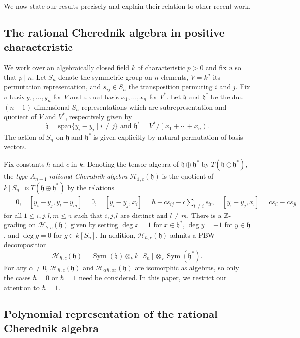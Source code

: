 \documentclass{amsart}
\numberwithin{equation}{section}
\theoremstyle{definition}
\newcommand{\ZZ}{\mathbb{Z}}
\newcommand{\h}{\mathfrak{h}}
\newcommand{\HH}{\mathcal{H}}
\newcommand{\Sym}{\operatorname{Sym}}
\newcommand{\sspan}{\text{span}}
\begin{document}
We now state our results precisely and explain their relation to other recent work.

\subsection{The rational Cherednik algebra in positive characteristic}

We work over an algebraically closed field $k$ of characteristic $p > 0$ and fix $n$ so that $p \mid n$.  Let $S_n$ denote the symmetric group on $n$ elements, $V = k^n$ its permutation representation, and $s_{ij} \in S_n$ the transposition permuting $i$ and $j$.  Fix a basis $y_1,\ldots,y_{n}$ for $V$ and a dual basis $x_1, \ldots, x_{n}$ for $V^*$.  Let $\h$ and $\h^*$ be the dual $(n - 1)$-dimensional $S_n$-representations which are subrepresentation and quotient of $V$ and $V^*$, respectively given by
\[
\h = \sspan\{y_i - y_j \mid i \neq j\} \text{ and } \h^* = V^*/(x_1 + \cdots + x_{n}).
\]
The action of $S_n$ on $\h$ and $\h^*$ is given explicitly by natural permutation of basis vectors.

Fix constants $\hbar$ and $c$ in $k$.  Denoting the tensor algebra of $\h \oplus \h^*$ by $T(\h \oplus \h^*)$, the \textit{type $A_{n - 1}$ rational Cherednik algebra} $\HH_{\hbar, c}(\h)$ is the quotient of $k[S_n] \ltimes T(\h \oplus \h^*)$ by the relations
\begin{align*}
[x_i,x_j]=0, \quad [y_i-y_j,y_l-y_m] = 0, \quad [y_i-y_j,x_i] = \hbar- cs_{ij}-c \sum_{t \ne i} s_{it},\quad [y_i-y_j,x_l] =cs_{il}-cs_{jl}\end{align*}
for all $1 \le i , j, l, m \le n$ such that $i,j,l$ are distinct and $l \neq m$. There is a $\ZZ$-grading on $\HH_{\hbar,c}(\h)$ given by setting $\deg x=1$ for $x \in \h^*$, $\deg y = -1$ for $y \in \h$, and $\deg g=0$ for $g \in k[S_n]$.  In addition, $\HH_{\hbar, c}(\h)$ admits a PBW decomposition 
\[
\HH_{\hbar,c}(\h) = \Sym(\h) \otimes_k k[S_n] \otimes_k \Sym(\h^*).
\]
For any $\alpha \ne 0$, $\HH_{\hbar,c}(\h)$ and $\HH_{\alpha\hbar,\alpha c}(\h)$ are isomorphic as algebras, so only the cases $\hbar = 0$ or $\hbar = 1$ need be considered.  In this paper, we restrict our attention to $\hbar = 1$.

\subsection{Polynomial representation of the rational Cherednik algebra}
\end{document}
